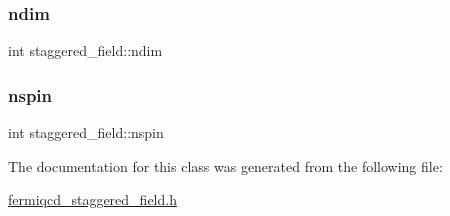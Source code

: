 \mbox{\label{classstaggered__field_a52eed99381c8e8649c6e79ec0fe7a4b8}} 
\subsubsection{\texorpdfstring{ndim}{ndim}}
{\footnotesize\ttfamily int staggered\+\_\+field\+::ndim}

\mbox{\label{classstaggered__field_aac06f4fadf069a57cda02bec2ecd8bda}} 
\subsubsection{\texorpdfstring{nspin}{nspin}}
{\footnotesize\ttfamily int staggered\+\_\+field\+::nspin}



The documentation for this class was generated from the following file\+:\begin{DoxyCompactItemize}
\item 
\hyperlink{fermiqcd__staggered__field_8h}{fermiqcd\+\_\+staggered\+\_\+field.\+h}\end{DoxyCompactItemize}
